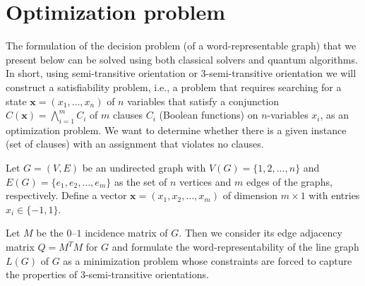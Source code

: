 \documentclass{article}
\newcommand{\mb}[1]{\boldsymbol{#1}}
\begin{document}
\section{Optimization problem}
The formulation of the decision problem (of a word-representable graph) that we present below can be solved using both classical solvers and quantum algorithms. In short, using semi-transitive orientation or $3$-semi-transitive orientation we will construct a satisfiability problem, i.e., a problem that requires searching for a state $\mb{x}=(x_{1},\ldots,x_{n})$ of $n$ variables that satisfy a conjunction $C(\mb{x}) = \bigwedge_{i=1}^{m}C_{i}$ of $m$ clauses $C_{i}$ (Boolean functions) on $n$-variables $x_{i}$, as an optimization problem.
We want to determine whether there is a given instance (set of clauses) with an assignment that violates no clauses.  


Let $G=(V,E)$ be an undirected graph with $V(G) = \{1,2,\ldots,n\}$ and $E(G) = \{e_{1},e_{2},\ldots,e_{m}\}$ as the set of $n$ vertices and $m$ edges of the graphs, respectively.
Define a vector $\mb{x} = (x_{1},x_{2},\ldots,x_{m})$ of dimension $m\times 1$ with entries $x_{i} \in \{-1,1\}$. 

Let $M$ be the $0$--$1$ incidence matrix of $G$. Then we consider its edge adjacency matrix $Q = M^{T}M$ for $G$ and formulate the word-representability of the line graph $L(G)$ of $G$ as a minimization problem whose constraints are forced to capture the properties of  $3$-semi-transitive orientations. %
\end{document}
